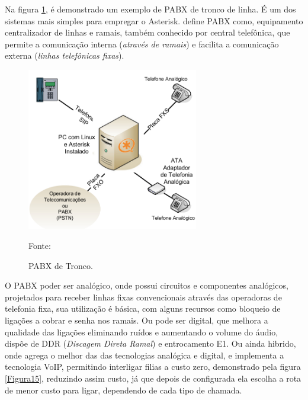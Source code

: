 Na figura \ref{Figura14}, é demonstrado um exemplo de PABX de tronco de linha. É um dos sistemas mais simples para empregar o Asterisk.  define PABX como, equipamento centralizador de linhas e ramais, também conhecido por central telefônica, que permite a comunicação interna (\textit{através de ramais}) e facilita  a comunicação externa (\textit{linhas telefônicas fixas}). 

\begin{figure}[h]
	\centering
	\includegraphics[width=7.5cm]{imagens/PABXAsterisk.jpg}
	\caption{PABX de Tronco.}
    \label{Figura14}
    Fonte: \cite{flavioeduardoandredade2005}
\end{figure}

O PABX poder ser analógico, onde possui circuitos e componentes analógicos, projetados para receber linhas fixas convencionais através das operadoras de telefonia fixa, sua utilização é básica, com alguns recursos como bloqueio de ligações a cobrar e senha nos ramais. Ou pode ser digital, que melhora a qualidade das ligações eliminando ruídos e aumentando o volume do áudio, dispõe de DDR (\textit{Discagem Direta Ramal}) e entrocamento E1. Ou ainda hibrido, onde agrega o melhor das das tecnologias analógica e digital, e implementa a tecnologia VoIP, permitindo interligar filias a custo zero, demonstrado pela figura \ref{Figura15}, reduzindo assim custo, já que depois de configurada ela escolha a rota de menor custo para ligar, dependendo de cada tipo de chamada. \cite{djaneelmajoanine2007}

